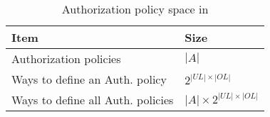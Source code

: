 \begin{table}
\centering
\caption{Authorization policy space in \labacOneOneOne{}}
\label{tab:policy-enumeration}
\begin{tabular}{|l|l|}
\hline
\textbf{Item}                                           & \textbf{Size}               \\ \hline
Authorization policies                   & $ |A|$                       \\ \hline
Ways to define an Auth. policy       & $2^ {|UL| \times |OL|}$             \\ \hline
Ways to define all Auth. policies & $  |A| \times 2^{|UL| \times |OL|}$ \\ \hline
\end{tabular}
\end{table}